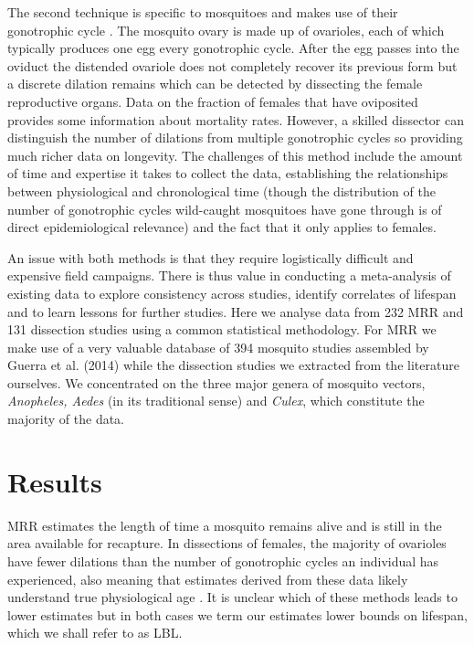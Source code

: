 \documentclass[]{article}
\begin{document}
The second technique is specific to mosquitoes and makes use of their
gonotrophic cycle \citep{polovodova1949determination,detinova1962age}. The mosquito ovary is made up of ovarioles, each of
which typically produces one egg every gonotrophic cycle. After the egg
passes into the oviduct the distended ovariole does not completely
recover its previous form but a discrete dilation remains which can be
detected by dissecting the female reproductive organs. Data on the
fraction of females that have oviposited provides some information about
mortality rates. However, a skilled dissector can distinguish the number
of dilations from multiple gonotrophic cycles so providing much richer
data on longevity. The challenges of this method include the amount of
time and expertise it takes to collect the data, establishing the
relationships between physiological and chronological time (though the
distribution of the number of gonotrophic cycles wild-caught mosquitoes
have gone through is of direct epidemiological relevance) and the fact
that it only applies to females.

An issue with both methods is that they require logistically difficult
and expensive field campaigns. There is thus value in conducting a
meta-analysis of existing data to explore consistency across studies,
identify correlates of lifespan and to learn lessons for further
studies. Here we analyse data from 232 MRR and 131 dissection studies
using a common statistical methodology. For MRR we make use of a very
valuable database of 394 mosquito studies assembled by Guerra et al.
(2014) while the dissection studies we extracted from the literature
ourselves. We concentrated on the three major genera of mosquito
vectors, \emph{Anopheles, Aedes} (in its traditional sense) and
\emph{Culex}, which constitute the majority of the data.


\section{Results}\label{results}

MRR estimates the length of time a mosquito remains alive and is still
in the area available for recapture. In dissections of females, the majority of ovarioles have fewer dilations than the number of gonotrophic cycles an individual has experienced, also meaning that estimates derived from these data likely understand true physiological age \citep{hugo2008evaluations}. It is unclear which of these methods leads to lower estimates but in both cases we term our estimates lower bounds on lifespan, which we shall refer to as LBL.
\end{document}

